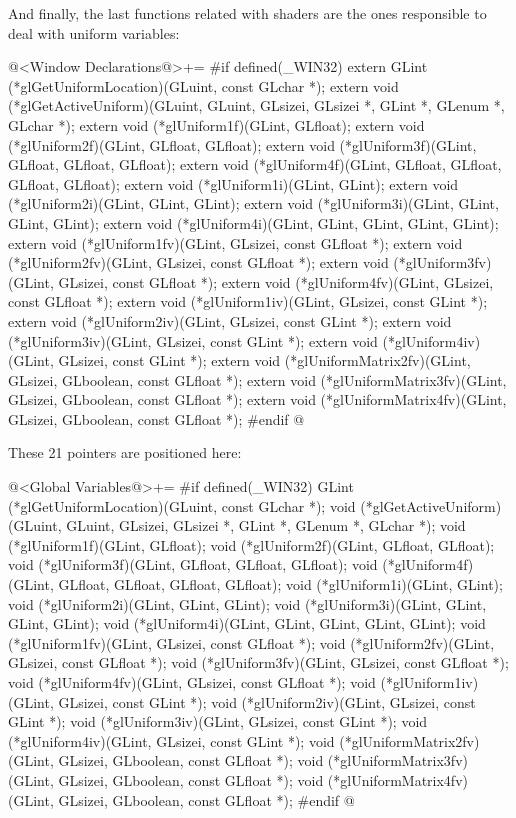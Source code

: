 And finally, the last functions related with shaders are the ones
responsible to deal with uniform variables:

\iniciocodigo
@<Window Declarations@>+=
#if defined(_WIN32)
extern GLint (*glGetUniformLocation)(GLuint, const GLchar *);
extern void (*glGetActiveUniform)(GLuint, GLuint, GLsizei, GLsizei *, GLint *,
                                  GLenum *, GLchar *);
extern void (*glUniform1f)(GLint, GLfloat);
extern void (*glUniform2f)(GLint, GLfloat, GLfloat);
extern void (*glUniform3f)(GLint, GLfloat, GLfloat, GLfloat);
extern void (*glUniform4f)(GLint, GLfloat, GLfloat, GLfloat, GLfloat);
extern void (*glUniform1i)(GLint, GLint);
extern void (*glUniform2i)(GLint, GLint, GLint);
extern void (*glUniform3i)(GLint, GLint, GLint, GLint);
extern void (*glUniform4i)(GLint, GLint, GLint, GLint, GLint);
extern void (*glUniform1fv)(GLint, GLsizei, const GLfloat *);
extern void (*glUniform2fv)(GLint, GLsizei, const GLfloat *);
extern void (*glUniform3fv)(GLint, GLsizei, const GLfloat *);
extern void (*glUniform4fv)(GLint, GLsizei, const GLfloat *);
extern void (*glUniform1iv)(GLint, GLsizei, const GLint *);
extern void (*glUniform2iv)(GLint, GLsizei, const GLint *);
extern void (*glUniform3iv)(GLint, GLsizei, const GLint *);
extern void (*glUniform4iv)(GLint, GLsizei, const GLint *);
extern void (*glUniformMatrix2fv)(GLint, GLsizei, GLboolean, const GLfloat *);
extern void (*glUniformMatrix3fv)(GLint, GLsizei, GLboolean, const GLfloat *);
extern void (*glUniformMatrix4fv)(GLint, GLsizei, GLboolean, const GLfloat *);
#endif
@
\fimcodigo

These 21 pointers are positioned here:

\iniciocodigo
@<Global Variables@>+=
#if defined(_WIN32)
GLint (*glGetUniformLocation)(GLuint, const GLchar *);
void (*glGetActiveUniform)(GLuint, GLuint, GLsizei, GLsizei *, GLint *,
                           GLenum *, GLchar *);
void (*glUniform1f)(GLint, GLfloat);
void (*glUniform2f)(GLint, GLfloat, GLfloat);
void (*glUniform3f)(GLint, GLfloat, GLfloat, GLfloat);
void (*glUniform4f)(GLint, GLfloat, GLfloat, GLfloat, GLfloat);
void (*glUniform1i)(GLint, GLint);
void (*glUniform2i)(GLint, GLint, GLint);
void (*glUniform3i)(GLint, GLint, GLint, GLint);
void (*glUniform4i)(GLint, GLint, GLint, GLint, GLint);
void (*glUniform1fv)(GLint, GLsizei, const GLfloat *);
void (*glUniform2fv)(GLint, GLsizei, const GLfloat *);
void (*glUniform3fv)(GLint, GLsizei, const GLfloat *);
void (*glUniform4fv)(GLint, GLsizei, const GLfloat *);
void (*glUniform1iv)(GLint, GLsizei, const GLint *);
void (*glUniform2iv)(GLint, GLsizei, const GLint *);
void (*glUniform3iv)(GLint, GLsizei, const GLint *);
void (*glUniform4iv)(GLint, GLsizei, const GLint *);
void (*glUniformMatrix2fv)(GLint, GLsizei, GLboolean, const GLfloat *);
void (*glUniformMatrix3fv)(GLint, GLsizei, GLboolean, const GLfloat *);
void (*glUniformMatrix4fv)(GLint, GLsizei, GLboolean, const GLfloat *);
#endif
@
\fimcodigo


